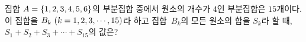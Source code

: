 집합 $A=\{1{,}\mkern3mu\mathopen{}2{,}\mkern3mu\mathopen{}3{,}\mkern3mu\mathopen{}4{,}\mkern3mu\mathopen{}5{,}\mkern3mu\mathopen{}6\}$의 부분집합 중에서 원소의 개수가 $4$인 부분집합은 $15$개이다. 이 집합을 $B_k\ (k=1{,}\mkern3mu\mathopen{}2{,}\mkern3mu\mathopen{}3{,}\mkern3mu\mathopen{}\cdots{,}\mkern3mu\mathopen{}15)$라 하고 집합~$B_k$의 모든 원소의 합을 $S_k$라 할 때, $S_1+S_2+S_3+\cdots+S_{15}$의 값은?
